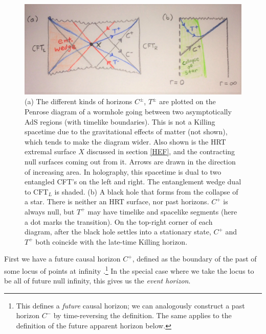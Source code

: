 \documentclass[12pt]{article}
\begin{document}
\begin{figure}[ht]
\centering
\includegraphics[width=.8\textwidth]{horizons.jpg}
\caption{\small (a) The different kinds of horizons $C^\pm$, $T^\pm$ are plotted on the Penrose diagram of a wormhole going between two asymptotically AdS regions (with timelike boundaries).  This is not a Killing spacetime due to the gravitational effects of matter (not shown), which tends to make the diagram wider.  Also shown is the HRT extremal surface $X$ discussed in section \ref{HEF}, and the contracting null surfaces coming out from it.  Arrows are drawn in the direction of increasing area.  In holography, this spacetime is dual to two entangled CFT's on the left and right.  The entanglement wedge dual to $\text{CFT}_L$ is shaded.  
(b) A black hole that forms from the collapse of a star.  There is neither an HRT surface, nor past horizons.  $C^+$ is always null, but $T^+$ may have timelike and spacelike segments (here a dot marks the transition).  On the top-right corner of each diagram, after the black hole settles into a stationary state, $C^+$ and $T^+$ both coincide with the late-time Killing horizon.}
\label{fig:horizons}
\end{figure}

First we have a future causal horizon $C^+$, defined as the boundary of the past of some locus of points at infinity \cite{jacobson2003horizon,wall2013generalized}.\footnote{This defines a \emph{future} causal horizon; we can analogously construct a past horizon $C^-$ by time-reversing the definition. The same applies to the definition of the future apparent horizon below.} In the special case where we take the locus to be all of future null infinity, this gives us the \emph{event horizon}.
\end{document}
